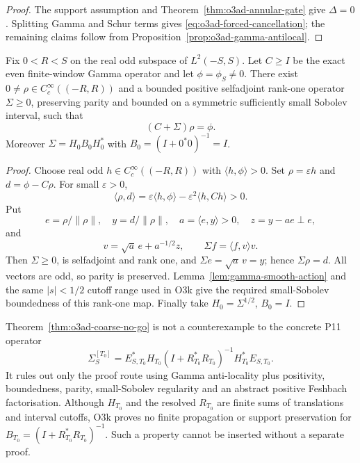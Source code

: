 \begin{proof}
The support assumption and Theorem~\ref{thm:o3ad-annular-gate} give \(\Delta=0\).
Splitting Gamma and Schur terms gives \eqref{eq:o3ad-forced-cancellation}; the remaining
claims follow from Proposition~\ref{prop:o3ad-gamma-antilocal}.
\end{proof}

\begin{theorem}
\label{thm:o3ad-coarse-no-go}
Fix \(0<R<S\) on the real odd subspace of \(L^2(-S,S)\).  Let \(C\ge I\) be the exact
even finite-window Gamma operator and let \(\phi=\phi_S\ne0\).  There exist
\(0\ne\rho\in C_c^\infty((-R,R))\) and a bounded positive selfadjoint rank-one
operator \(\Sigma\ge0\), preserving parity and bounded on a symmetric sufficiently
small Sobolev interval, such that
\[
 \boxed{(C+\Sigma)\rho=\phi.}
\tag{O3AD.12}\label{eq:o3ad-abstract-countermodel}
\]
Moreover \(\Sigma=H_0B_0H_0^*\) with
\(B_0=(I+0^*0)^{-1}=I\).
\end{theorem}

\begin{proof}
Choose real odd \(h\in C_c^\infty((-R,R))\) with
\(\langle h,\phi\rangle>0\).  Set \(\rho=\varepsilon h\) and
\(d=\phi-C\rho\).  For small \(\varepsilon>0\),
\[
 \langle\rho,d\rangle
 =\varepsilon\langle h,\phi\rangle
 -\varepsilon^2\langle h,Ch\rangle>0.
\]
Put
\[
 e=\rho/\|\rho\|,
 \quad y=d/\|\rho\|,
 \quad a=\langle e,y\rangle>0,
 \quad z=y-ae\perp e,
\]
and
\[
 v=\sqrt a\,e+a^{-1/2}z,
 \qquad \Sigma f=\langle f,v\rangle v.
\]
Then \(\Sigma\ge0\), is selfadjoint and rank one, and
\(\Sigma e=\sqrt a\,v=y\); hence \(\Sigma\rho=d\).  All vectors are odd, so parity is
preserved.  Lemma~\ref{lem:gamma-smooth-action} and the same \(|s|<1/2\) cutoff range
used in O3k give the required small-Sobolev boundedness of this rank-one map.  Finally
take \(H_0=\Sigma^{1/2}\), \(B_0=I\).
\end{proof}

\begin{remark}
\label{rem:o3ad-countermodel-scope}
Theorem~\ref{thm:o3ad-coarse-no-go} is not a counterexample to the concrete P11
operator
\[
 \Sigma_S^{[T_0]}
 =E_{S,T_0}^*H_{T_0}(I+R_{T_0}^*R_{T_0})^{-1}H_{T_0}^*E_{S,T_0}.
\]
It rules out only the proof route using Gamma anti-locality plus positivity,
boundedness, parity, small-Sobolev regularity and an abstract positive Feshbach
factorisation.  Although \(H_{T_0}\) and the resolved \(R_{T_0}\) are finite sums of
translations and interval cutoffs, O3k proves no finite propagation or support
preservation for \(B_{T_0}=(I+R_{T_0}^*R_{T_0})^{-1}\).  Such a property cannot be
inserted without a separate proof.
\end{remark}

